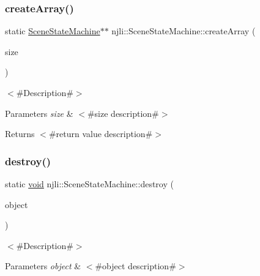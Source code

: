 \subsubsection{\texorpdfstring{create\+Array()}{createArray()}}
{\footnotesize\ttfamily static \mbox{\hyperlink{classnjli_1_1_scene_state_machine}{Scene\+State\+Machine}}$\ast$$\ast$ njli\+::\+Scene\+State\+Machine\+::create\+Array (\begin{DoxyParamCaption}\item[{const \mbox{\hyperlink{_util_8h_a10e94b422ef0c20dcdec20d31a1f5049}{u32}}}]{size }\end{DoxyParamCaption})\hspace{0.3cm}{\ttfamily [static]}}

$<$\#\+Description\#$>$


\begin{DoxyParams}{Parameters}
{\em size} & $<$\#size description\#$>$\\
\hline
\end{DoxyParams}
\begin{DoxyReturn}{Returns}
$<$\#return value description\#$>$ 
\end{DoxyReturn}
\mbox{\label{classnjli_1_1_scene_state_machine_ac5cd66601629095b24f9b481670b6bfd}} 
\subsubsection{\texorpdfstring{destroy()}{destroy()}}
{\footnotesize\ttfamily static \mbox{\hyperlink{_thread_8h_af1e856da2e658414cb2456cb6f7ebc66}{void}} njli\+::\+Scene\+State\+Machine\+::destroy (\begin{DoxyParamCaption}\item[{\mbox{\hyperlink{classnjli_1_1_scene_state_machine}{Scene\+State\+Machine}} $\ast$}]{object }\end{DoxyParamCaption})\hspace{0.3cm}{\ttfamily [static]}}

$<$\#\+Description\#$>$


\begin{DoxyParams}{Parameters}
{\em object} & $<$\#object description\#$>$ \\
\hline
\end{DoxyParams}
\mbox{\label{classnjli_1_1_scene_state_machine_a9ce443b1a603e328c6e4b0e4d8579abd}} 
